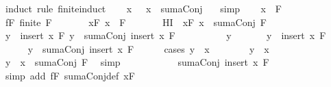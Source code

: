 \begin{isabellebody}
%
\isadelimproof
%
\endisadelimproof
%
\isatagproof
{}\isamarkupfalse%
\ {\isacharparenleft}induct\ rule{\isacharcolon}\ finite{\isacharunderscore}induct{\isacharparenright}\isanewline
\ \ \isamarkupfalse%
\ {\isachardoublequoteopen}{\isasymforall}x\ {\isasymin}\ {\isacharbraceleft}{\isacharbraceright}{\isachardot}\ x\ {\isasymle}\ sumaConj\ {\isacharbraceleft}{\isacharbraceright}{\isachardoublequoteclose}\ \isamarkupfalse%
\ simp\isanewline
{}\isamarkupfalse%
\isanewline
\ \ \isamarkupfalse%
\ x\ \ F\isanewline
\ \ \isamarkupfalse%
\ fF{\isacharcolon}\ {\isachardoublequoteopen}finite\ F{\isachardoublequoteclose}\ \isanewline
\ \ \ \ \ \ xF{\isacharcolon}\ {\isachardoublequoteopen}x\ {\isasymnotin}\ F{\isachardoublequoteclose}\ \isanewline
\ \ \ \ \ \ HI{\isacharcolon}\ {\isachardoublequoteopen}{\isasymforall}\ x{\isasymin}F{\isachardot}\ x\ {\isasymle}\ sumaConj\ F{\isachardoublequoteclose}\isanewline
\ \ \isamarkupfalse%
\ {\isachardoublequoteopen}{\isasymforall}y\ {\isasymin}\ insert\ x\ F{\isachardot}\ y\ {\isasymle}\ sumaConj\ {\isacharparenleft}insert\ x\ F{\isacharparenright}{\isachardoublequoteclose}\isanewline
\ \ \isamarkupfalse%
\ \isanewline
\ \ \ \ \isamarkupfalse%
\ y\ \isanewline
\ \ \ \ \isamarkupfalse%
\ {\isachardoublequoteopen}y\ {\isasymin}\ insert\ x\ F{\isachardoublequoteclose}\isanewline
\ \ \ \ \isamarkupfalse%
\ {\isachardoublequoteopen}y\ {\isasymle}\ sumaConj\ {\isacharparenleft}insert\ x\ F{\isacharparenright}{\isachardoublequoteclose}\isanewline
\ \ \ \ \isamarkupfalse%
\ {\isacharparenleft}cases\ {\isachardoublequoteopen}y\ {\isacharequal}\ x{\isachardoublequoteclose}{\isacharparenright}\isanewline
\ \ \ \ \ \ \isamarkupfalse%
\ {\isachardoublequoteopen}y\ {\isacharequal}\ x{\isachardoublequoteclose}\isanewline
\ \ \ \ \ \ \isamarkupfalse%
\ \isamarkupfalse%
\ {\isachardoublequoteopen}y\ {\isasymle}\ x\ {\isacharplus}\ {\isacharparenleft}sumaConj\ F{\isacharparenright}{\isachardoublequoteclose}\ \isamarkupfalse%
\ simp\isanewline
\ \ \ \ \ \ \isamarkupfalse%
\ \isamarkupfalse%
\ {\isachardoublequoteopen}{\isasymdots}\ {\isacharequal}\ sumaConj\ {\isacharparenleft}insert\ x\ F{\isacharparenright}{\isachardoublequoteclose}\ \ \ \isamarkupfalse%
\ {\isacharparenleft}simp\ add{\isacharcolon}\ fF\ sumaConj{\isacharunderscore}def\ xF{\isacharparenright}\ \isanewline

\end{isabellebody}
